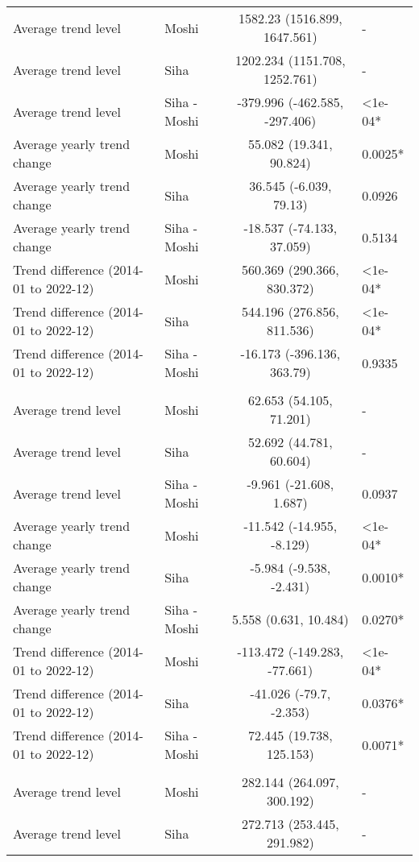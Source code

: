 \begin{longtable}{l|lcl}
Average trend level & Moshi & 1582.23 (1516.899, 1647.561) & - \\ 
Average trend level & Siha & 1202.234 (1151.708, 1252.761) & - \\ 
Average trend level & Siha - Moshi & -379.996 (-462.585, -297.406) & <1e-04* \\ 
Average yearly trend change & Moshi & 55.082 (19.341, 90.824) & 0.0025* \\ 
Average yearly trend change & Siha & 36.545 (-6.039, 79.13) & 0.0926 \\ 
Average yearly trend change & Siha - Moshi & -18.537 (-74.133, 37.059) & 0.5134 \\ 
Trend difference (2014-01 to 2022-12) & Moshi & 560.369 (290.366, 830.372) & <1e-04* \\ 
Trend difference (2014-01 to 2022-12) & Siha & 544.196 (276.856, 811.536) & <1e-04* \\ 
Trend difference (2014-01 to 2022-12) & Siha - Moshi & -16.173 (-396.136, 363.79) & 0.9335 \\ 
\midrule\addlinespace[2.5pt]
\multicolumn{4}{l}{Malnutrition} \\ 
\midrule\addlinespace[2.5pt]
Average trend level & Moshi & 62.653 (54.105, 71.201) & - \\ 
Average trend level & Siha & 52.692 (44.781, 60.604) & - \\ 
Average trend level & Siha - Moshi & -9.961 (-21.608, 1.687) & 0.0937 \\ 
Average yearly trend change & Moshi & -11.542 (-14.955, -8.129) & <1e-04* \\ 
Average yearly trend change & Siha & -5.984 (-9.538, -2.431) & 0.0010* \\ 
Average yearly trend change & Siha - Moshi & 5.558 (0.631, 10.484) & 0.0270* \\ 
Trend difference (2014-01 to 2022-12) & Moshi & -113.472 (-149.283, -77.661) & <1e-04* \\ 
Trend difference (2014-01 to 2022-12) & Siha & -41.026 (-79.7, -2.353) & 0.0376* \\ 
Trend difference (2014-01 to 2022-12) & Siha - Moshi & 72.445 (19.738, 125.153) & 0.0071* \\ 
\midrule\addlinespace[2.5pt]
\multicolumn{4}{l}{Diarrhea} \\ 
\midrule\addlinespace[2.5pt]
Average trend level & Moshi & 282.144 (264.097, 300.192) & - \\ 
Average trend level & Siha & 272.713 (253.445, 291.982) & - \\ 

\end{longtable}
